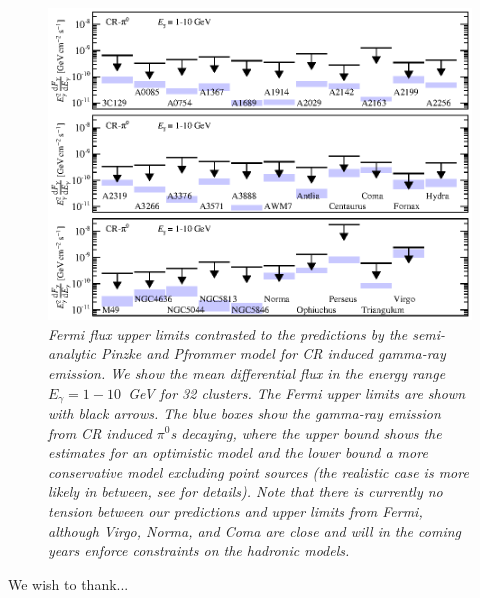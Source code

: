 \documentclass[10pt,aps,pra,reprint,amsmath,amsfonts,amssymb,showpacs]{revtex4-1}
\begin{document}
\begin{figure}
\begin{minipage}{2.0\columnwidth}
  \includegraphics[width=0.99\columnwidth]{figures/Fermi.comp.CR.diff.eps}
  \caption{\it Fermi flux upper limits contrasted to the predictions
    by the semi-analytic Pinzke and Pfrommer model for CR induced
    gamma-ray emission. We show the mean differential flux in the
    energy range $E_\gamma=1-10$~GeV for 32 clusters. The Fermi upper
    limits are shown with black arrows. The blue boxes show the
    gamma-ray emission from CR induced $\pi^0$\:s decaying, where the
    upper bound shows the estimates for an optimistic model and the
    lower bound a more conservative model excluding point sources (the
    realistic case is more likely in between, see
    \cite{2010MNRAS.409..449P} for details). Note that there is
    currently no tension between our predictions and upper limits from
    Fermi, although Virgo, Norma, and Coma are close and will in the
    coming years enforce constraints on the hadronic models.}
 \label{fig15}
\end{minipage}
\end{figure}




\smallskip
We wish to thank...

%
\end{document}
